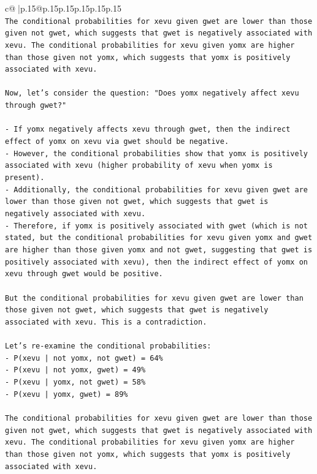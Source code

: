 \documentclass{article}
\begin{document}
{\begin{supertabular}{c@{$\;$}|p{.15\linewidth}@{}p{.15\linewidth}p{.15\linewidth}p{.15\linewidth}p{.15\linewidth}p{.15\linewidth}}
{{{\\ 
\texttt{The conditional probabilities for xevu given gwet are lower than those given not gwet, which suggests that gwet is negatively associated with xevu. The conditional probabilities for xevu given yomx are higher than those given not yomx, which suggests that yomx is positively associated with xevu.} \\
\\ 
\texttt{Now, let's consider the question: "Does yomx negatively affect xevu through gwet?"} \\
\\ 
\texttt{{-}   If yomx negatively affects xevu through gwet, then the indirect effect of yomx on xevu via gwet should be negative.} \\
\texttt{{-}   However, the conditional probabilities show that yomx is positively associated with xevu (higher probability of xevu when yomx is present).} \\
\texttt{{-}   Additionally, the conditional probabilities for xevu given gwet are lower than those given not gwet, which suggests that gwet is negatively associated with xevu.} \\
\texttt{{-}   Therefore, if yomx is positively associated with gwet (which is not stated, but the conditional probabilities for xevu given yomx and gwet are higher than those given yomx and not gwet, suggesting that gwet is positively associated with xevu), then the indirect effect of yomx on xevu through gwet would be positive.} \\
\\ 
\texttt{But the conditional probabilities for xevu given gwet are lower than those given not gwet, which suggests that gwet is negatively associated with xevu. This is a contradiction.} \\
\\ 
\texttt{Let's re{-}examine the conditional probabilities:} \\
\texttt{{-}   P(xevu | not yomx, not gwet) = 64\%} \\
\texttt{{-}   P(xevu | not yomx, gwet) = 49\%} \\
\texttt{{-}   P(xevu | yomx, not gwet) = 58\%} \\
\texttt{{-}   P(xevu | yomx, gwet) = 89\%} \\
\\ 
\texttt{The conditional probabilities for xevu given gwet are lower than those given not gwet, which suggests that gwet is negatively associated with xevu. The conditional probabilities for xevu given yomx are higher than those given not yomx, which suggests that yomx is positively associated with xevu.} \\
}}}
\end{supertabular}}
\end{document}
